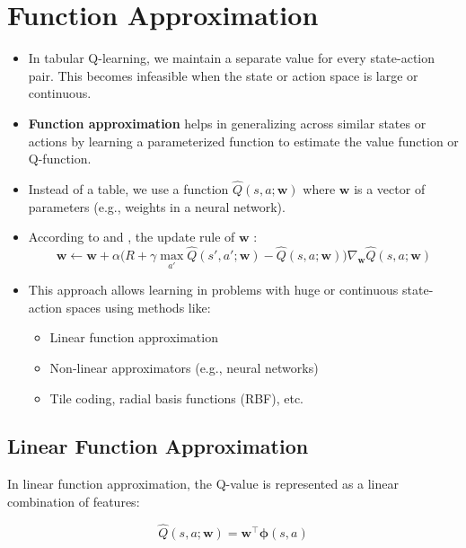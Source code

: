 \documentclass[10pt,twocolumn,letterpaper]{article}
\begin{document}
\section{Function Approximation}

\begin{itemize}
    \item In tabular Q-learning, we maintain a separate value for every state-action pair. This becomes infeasible when the state or action space is large or continuous.
    
    \item \textbf{Function approximation} helps in generalizing across similar states or actions by learning a parameterized function to estimate the value function or Q-function.
    
    \item Instead of a table, we use a function $\hat{Q}(s, a; \boldsymbol{w})$ where $\boldsymbol{w}$ is a vector of parameters (e.g., weights in a neural network).
    
    \item According to \cite{lecture10} and \cite{ieee_qlearning}, the update rule of $\boldsymbol{w}$  :
    \[
    \boldsymbol{w} \leftarrow \boldsymbol{w} + \alpha \big( R + \gamma \max_{a'} \hat{Q}(s', a'; \boldsymbol{w}) - \hat{Q}(s, a; \boldsymbol{w}) \big) \nabla_{\boldsymbol{w}} \hat{Q}(s, a; \boldsymbol{w})
    \]
    
    \item This approach allows learning in problems with huge or continuous state-action spaces using methods like:
    \begin{itemize}
        \item Linear function approximation
        \item Non-linear approximators (e.g., neural networks)
        \item Tile coding, radial basis functions (RBF), etc.
    \end{itemize}
\end{itemize}

\subsection*{Linear Function Approximation}

In linear function approximation, the Q-value is represented as a linear combination of features:

\[
\hat{Q}(s, a; \boldsymbol{w}) = \boldsymbol{w}^\top \boldsymbol{\phi}(s, a)
\]
\end{document}
